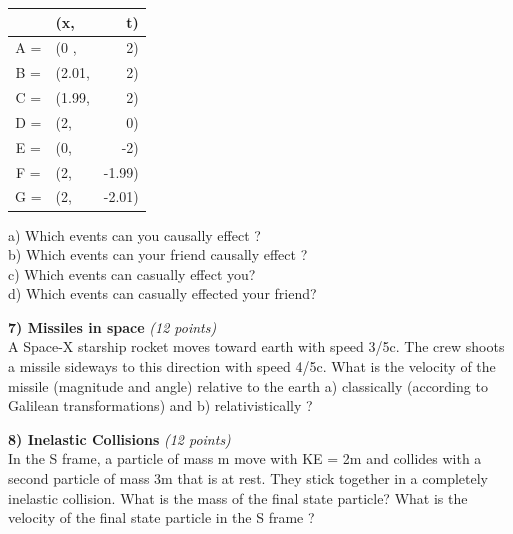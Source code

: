 {\begin{tabular}{clr}
  & (x,& t)\\
  \hline
  A = & (0   , & 2)\\
  B = & (2.01, & 2)\\
  C = & (1.99, & 2)\\
  D = & (2,    & 0)\\
  E = & (0,    & -2)\\
  F = & (2,    & -1.99)\\
  G = & (2,    & -2.01)\\
\end{tabular}

\vspace{0.1in}

a) Which events can you causally effect ?\\

b) Which events can your friend causally effect ?\\

c) Which events can casually effect you?\\

d) Which events can casually effected your friend?

\clearpage

%


\textbf{7) Missiles in space}  \hfill \textit{(12 points)}\\
A Space-X starship rocket moves toward earth with speed 3/5c.
The crew shoots a missile sideways to this direction with speed 4/5c.
What is the velocity of the missile (magnitude and angle) relative to the earth a) classically (according to Galilean transformations) and b) relativistically  ? 

\vfill



\textbf{8) Inelastic Collisions}  \hfill \textit{(12 points)}\\
In the S frame, a particle of mass m move with KE = 2m and collides with a second particle of mass 3m that is at rest.
They stick together in a completely inelastic collision.
What is the mass of the final state particle?
What is the velocity of the final state particle in the S frame ?

}
